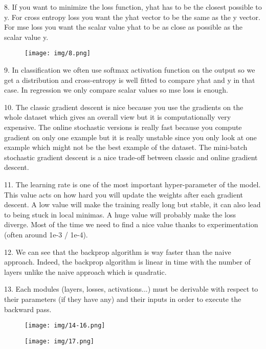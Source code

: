 8. If you want to minimize the loss function, yhat has to be the closest possible to y. For cross entropy loss you want the yhat vector to be the same as the y vector. For mse loss you want the scalar value yhat to be as close as possible as the scalar value y.

\begin{figure}[H]
  \centering
    \texttt{[image: img/8.png]}
\end{figure}

9. In classification we often use softmax activation function on the output so we get a distribution and cross-entropy is well fitted to compare yhat and y in that case. In regression we only compare scalar values so mse loss is enough.

10. The classic gradient descent is nice because you use the gradients on the whole dataset which gives an overall view but it is computationally very expensive. The online stochastic versions is really fast because you compute gradient on only one example but it is really unstable since you only look at one example which might not be the best example of the dataset. The mini-batch stochastic gradient descent is a nice trade-off between classic and online gradient descent.

11. The learning rate is one of the most important hyper-parameter of the model. This value acts on how hard you will update the weights after each gradient descent. A low value will make the training really long but stable, it can also lead to being stuck in local minimas. A huge value will probably make the loss diverge. Most of the time we need to find a nice value thanks to experimentation (often around 1e-3 / 1e-4). 

12. We can see that the backprop algorithm is way faster than the naive approach. Indeed, the backprop algorithm is linear in time with the number of layers unlike the naive approach which is quadratic.

13. Each modules (layers, losses, activations...) must be derivable with respect to their parameters (if they have any) and their inputs in order to execute the backward pass.

\begin{figure}[H]
  \centering
    \texttt{[image: img/14-16.png]}
\end{figure}

\begin{figure}[H]
  \centering
    \texttt{[image: img/17.png]}
\end{figure}

